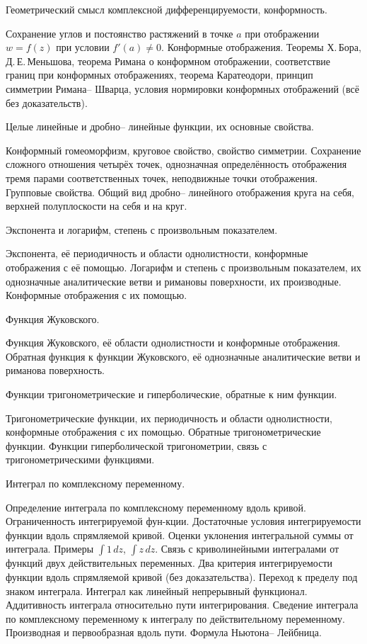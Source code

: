\documentclass[a4paper]{article}
\begin{document}
\begin{nums}{-2}
\item Геометрический смысл комплексной дифференцируемости, конформность.

Сохранение углов и постоянство
растяжений в точке $a$ при отображении $w = f(z)$ при условии $f'(a) \neq 0$. Конформные отображения. Теоремы
Х.\,Бора, Д.\,Е.\,Меньшова, теорема Римана о конформном отображении, соответствие границ при конформных
отображениях, теорема Каратеодори, принцип симметрии Римана-- Шварца, условия нормировки конформных
отображений (всё без доказательств).

\item Целые линейные и дробно-- линейные функции, их основные свойства.

Конформный гомеоморфизм, круговое
свойство, свойство симметрии. Сохранение сложного отношения четырёх точек, однозначная определённость
отображения тремя парами соответственных точек, неподвижные точки отображения. Групповые свойства. Общий вид
дробно-- линейного отображения круга на себя, верхней полуплоскости на себя и на круг.

\item Экспонента и логарифм, степень с произвольным показателем.

Экспонента, её периодичность и области
однолистности, конформные отображения с её помощью. Логарифм и степень с произвольным показателем, их
однозначные аналитические ветви и римановы поверхности, их производные. Конформные отображения с их помощью.

\item Функция Жуковского.

Функция Жуковского, её области однолистности и конформные отображения. Обратная
функция к функции Жуковского, её однозначные аналитические ветви и риманова поверхность.

\item Функции тригонометрические и гиперболические, обратные к ним функции.

Тригонометрические функции, их
периодичность и области однолистности, конформные отображения с их помощью. Обратные тригонометрические
функции. Функции гиперболической тригонометрии, связь с тригонометрическими функциями.

\item Интеграл по комплексному переменному.

Определение интеграла по комплексному переменному вдоль кривой. Ограниченность интегрируемой
фун-\break кции. Достаточные условия интегрируемости функции вдоль спрямляемой кривой. Оценки
уклонения интегральной суммы от интеграла. Примеры $\int 1\,dz$, $\int z\,dz$. Связь с
криволинейными интегралами от функций двух действительных переменных. Два критерия интегрируемости
функции вдоль спрямляемой кривой (без доказательства). Переход к пределу под знаком интеграла.
Интеграл как линейный непрерывный функционал. Аддитивность интеграла относительно пути
интегрирования. Сведение интеграла по комплексному переменному к интегралу по действительному
переменному. Производная и первообразная вдоль пути. Формула Ньютона-- Лейбница.


\end{nums}
\end{document}

